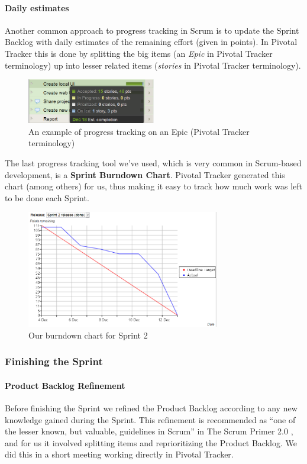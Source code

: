 \paragraph{Daily estimates}
Another common approach to progress tracking in Scrum is to update the Sprint Backlog with daily estimates of the remaining effort (given in points). In Pivotal Tracker this is done by splitting the big items (an \textit{Epic} in Pivotal Tracker terminology) up into lesser related items (\textit{stories} in Pivotal Tracker terminology).
\begin{figure}[htb]
	\centering
	\includegraphics[width=0.50\textwidth]{SCRUM/graphics/epic-example.png}
	\caption{An example of progress tracking on an Epic (Pivotal Tracker terminology)}
	\label{fig:epic-example}
\end{figure}

The last progress tracking tool we've used, which is very common in Scrum-based development, is a  \textbf{Sprint Burndown Chart}. Pivotal Tracker generated this chart (among others) for us, thus making it easy to track how much work was left to be done each Sprint.
\begin{figure}[htb]
	\centering
	\includegraphics[width=0.75\textwidth]{SCRUM/graphics/burndown-chart.png}
	\caption{Our burndown chart for Sprint 2}
	\label{fig:burndown-chart}
\end{figure}


\subsubsection{Finishing the Sprint}

\paragraph{Product Backlog Refinement}
Before finishing the Sprint we refined the Product Backlog according to any new knowledge gained during the Sprint. This refinement is recommended as ``one of the lesser known, but valuable, guidelines in Scrum'' in The Scrum Primer 2.0 \cite{ScrumPrimer2}, and for us it involved splitting items and reprioritizing the Product Backlog. We did this in a short meeting working directly in Pivotal Tracker.

